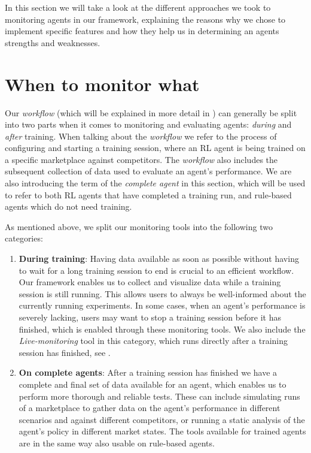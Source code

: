 \begin{jointwork}\label{ch:Approaches}
	In this section we will take a look at the different approaches we took to monitoring agents in our framework, explaining the reasons why we chose to implement specific features and how they help us in determining an agents strengths and weaknesses.
\end{jointwork}

\section{When to monitor what}\label{sec:WhenToMonitorWhat}

Our \emph{workflow} (which will be explained in more detail in ) can generally be split into two parts when it comes to monitoring and evaluating agents: \emph{during} and \emph{after} training. When talking about the \emph{workflow} we refer to the process of configuring and starting a training session, where an RL agent is being trained on a specific marketplace against competitors. The \emph{workflow} also includes the subsequent collection of data used to evaluate an agent's performance. We are also introducing the term of the \emph{complete agent} in this section, which will be used to refer to both RL agents that have completed a training run, and rule-based agents which do not need training.

As mentioned above, we split our monitoring tools into the following two categories:

\begin{enumerate}
	\item \textbf{During training}: Having data available as soon as possible without having to wait for a long training session to end is crucial to an efficient workflow. Our framework enables us to collect and visualize data while a training session is still running. This allows users to always be well-informed about the currently running experiments. In some cases, when an agent's performance is severely lacking, users may want to stop a training session before it has finished, which is enabled through these monitoring tools. We also include the \emph{Live-monitoring} tool in this category, which runs directly after a training session has finished, see .

	\item \textbf{On complete agents}: After a training session has finished we have a complete and final set of data available for an agent, which enables us to perform more thorough and reliable tests. These can include simulating runs of a marketplace to gather data on the agent's performance in different scenarios and against different competitors, or running a static analysis of the agent's policy in different market states. The tools available for trained agents are in the same way also usable on rule-based agents.
\end{enumerate}

